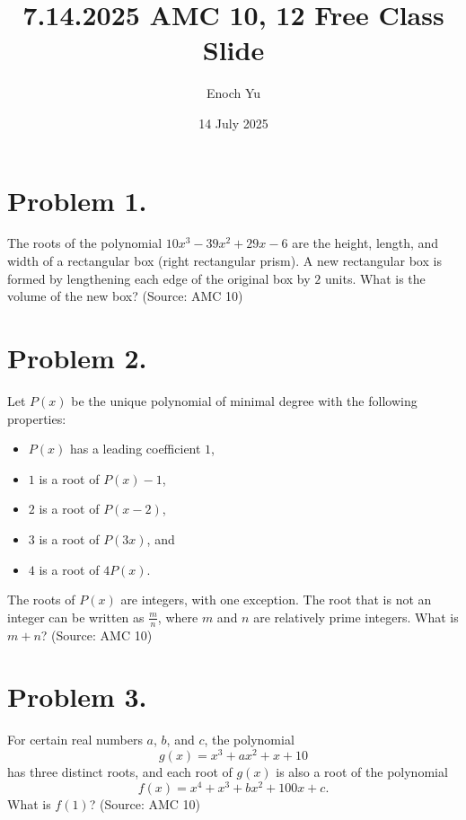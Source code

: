 \documentclass{article}
\title{7.14.2025 AMC 10, 12 Free Class Slide}
\author{Enoch Yu}
\date{14 July 2025}
\begin{document}
\section*{Problem 1.} %
The roots of the polynomial $10x^3 - 39x^2 + 29x - 6$
are the height, length, and width of a rectangular box
(right rectangular prism). A new rectangular box is
formed by lengthening each edge of the original box by
$2$ units. What is the volume of the new box? (Source: AMC 10)

\newpage
\section*{Problem 2.} %
Let $P(x)$ be the unique polynomial of minimal degree
with the following properties:
\begin{itemize}
    \item $P(x)$ has a leading coefficient $1$,
    \item $1$ is a root of $P(x)-1$,
    \item $2$ is a root of $P(x-2)$,
    \item $3$ is a root of $P(3x)$, and
    \item $4$ is a root of $4P(x)$.
\end{itemize}
The roots of $P(x)$ are integers, with one exception.
The root that is not an integer can be written as
$\frac{m}{n}$, where $m$ and $n$ are relatively prime
integers. What is $m+n$? (Source: AMC 10)

\newpage
\section*{Problem 3.} %
For certain real numbers $a$, $b$, and $c$, the polynomial
\[
g(x) = x^3 + ax^2 + x + 10
\]
has three distinct roots, and each root of $g(x)$
is also a root of the polynomial
\[
f(x) = x^4 + x^3 + bx^2 + 100x + c.
\]
What is $f(1)$? (Source: AMC 10)
\end{document}
